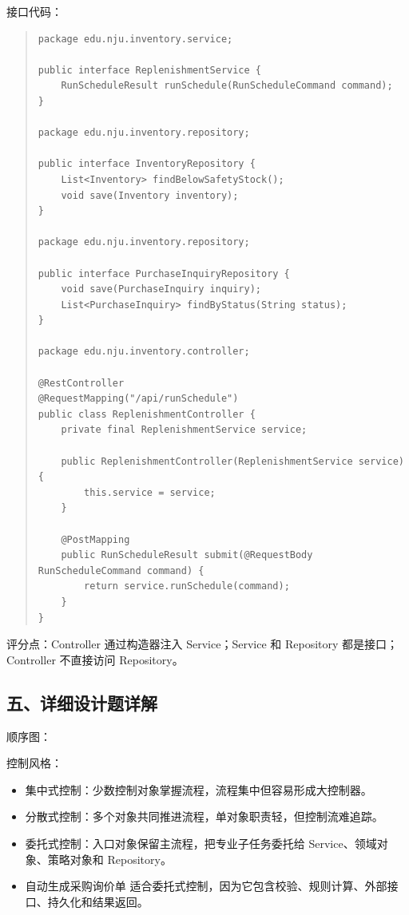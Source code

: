 \documentclass[UTF8,zihao=-4]{ctexart}
\begin{document}



接口代码：


\begin{quote}
\footnotesize
\begin{verbatim}
package edu.nju.inventory.service;

public interface ReplenishmentService {
    RunScheduleResult runSchedule(RunScheduleCommand command);
}

package edu.nju.inventory.repository;

public interface InventoryRepository {
    List<Inventory> findBelowSafetyStock();
    void save(Inventory inventory);
}

package edu.nju.inventory.repository;

public interface PurchaseInquiryRepository {
    void save(PurchaseInquiry inquiry);
    List<PurchaseInquiry> findByStatus(String status);
}

package edu.nju.inventory.controller;

@RestController
@RequestMapping("/api/runSchedule")
public class ReplenishmentController {
    private final ReplenishmentService service;

    public ReplenishmentController(ReplenishmentService service) {
        this.service = service;
    }

    @PostMapping
    public RunScheduleResult submit(@RequestBody RunScheduleCommand command) {
        return service.runSchedule(command);
    }
}
\end{verbatim}
\end{quote}



评分点：Controller 通过构造器注入 Service；Service 和 Repository 都是接口；Controller 不直接访问 Repository。


\subsection{五、详细设计题详解}


顺序图：





控制风格：


\begin{itemize}
\item 集中式控制：少数控制对象掌握流程，流程集中但容易形成大控制器。
\item 分散式控制：多个对象共同推进流程，单对象职责轻，但控制流难追踪。
\item 委托式控制：入口对象保留主流程，把专业子任务委托给 Service、领域对象、策略对象和 Repository。
\item 自动生成采购询价单 适合委托式控制，因为它包含校验、规则计算、外部接口、持久化和结果返回。
\end{itemize}
\end{document}
